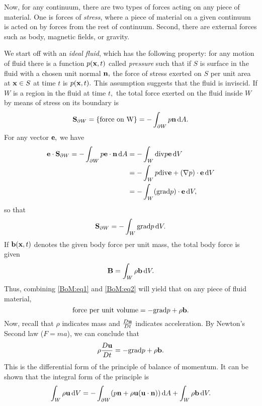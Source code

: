 \documentclass[10pt,a4paper,final]{article}
\begin{document}
Now, for any continuum, there are two types of forces acting on any piece of material. One is forces of \emph{stress}, where a piece of material on a given continuum is acted on by forces from the rest of continuum. Second, there are external forces such as body, magnetic fields, or gravity. 

We start off with an \emph{ideal fluid}, which has the following property: for any motion of fluid there is a function $p({\bf x}, t)$ called \emph{pressure} such that if $S$ is surface in the fluid with a chosen unit normal ${\bf n},$ the force of stress exerted on $S$ per unit area at ${\bf x} \in S$ at time $t$ is $p({\bf x},t).$ This assumption suggests that the fluid is inviscid. If $W$ is a region in the fluid at time $t,$ the total force exerted on the fluid inside $W$ by means of stress on its boundary is 
\[ 
{\bf S}_{\partial W} = \{ \mbox{force on W}\} = - \int_{\partial W} p{\bf n} \,\mathrm{d} A.
\]
For any vector ${\bf e},$ we have 
\begin{align*}
{\bf e} \cdot {\bf S}_{\partial W} = - \int_{\partial W} p{\bf e} \cdot {\bf n} \,\mathrm{d} A &= - \int_{W} {\rm div}p{\bf e}\,\mathrm{d} V \\
&= - \int_{W} p{\rm div}{\bf e} + (\nabla p) \cdot {\bf e} \,\mathrm{d} V \\
&= - \int_{W} ({\rm grad} p) \cdot {\bf e} \,\mathrm{d} V, 
\end{align*}
so that 
\begin{equation}\label{BoM:eq1}
{\bf S}_{\partial W} = - \int_{W} {\rm grad} p \,\mathrm{d} V.
\end{equation} 
If ${\bf b}({\bf x},t)$ denotes the given body force per unit mass, the total body force is given 
\begin{equation}\label{BoM:eq2}
{\bf B} = \int_{W} \rho{\bf b} \,\mathrm{d} V.
\end{equation}
Thus, combining \eqref{BoM:eq1} and \eqref{BoM:eq2} will yield that on any piece of fluid material,
\[ 
\mbox{force per unit volume} = - {\rm grad} p + \rho{\bf b}.
\]
Now, recall that $\rho$ indicates mass and $\frac{D{\bf u}}{Dt}$ indicates acceleration. By Newton's Second law ($F = ma$), we can conclude that
\begin{equation}\label{BoM:eq3}
\rho\frac{D{\bf u}}{Dt} = - {\rm grad} p + \rho{\bf b}.
\end{equation}
This is the differential form of the principle of balance of momentum. It can be shown that the integral form of the principle is 
\begin{equation}\label{BoM:eq4}
\int_{W} \rho {\bf u}  \,\mathrm{d} V = - \int_{\partial W} (p{\bf n} + \rho {\bf u}({\bf u} \cdot {\bf n})) \,\mathrm{d} A +\int_{W} \rho{\bf b} \,\mathrm{d} V.
\end{equation}
\end{document}
